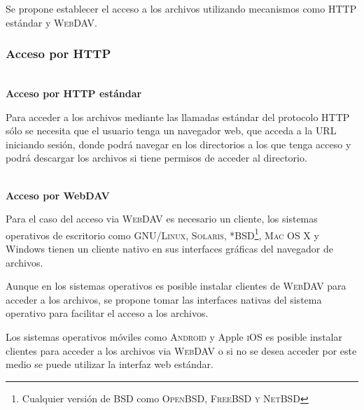 Se propone establecer el acceso a los archivos utilizando mecanismos como \textsc{HTTP} est\'{a}ndar y \textsc{WebDAV}.

        \subsubsection {Acceso por HTTP}

          \textbf{\\ Acceso por HTTP est\'{a}ndar \\}

Para acceder a los archivos mediante las llamadas est\'{a}ndar del protocolo HTTP s\'{o}lo se necesita que el usuario tenga un navegador web, que acceda a la \textsc{URL} iniciando sesi\'{o}n, donde podr\'{a} navegar en los directorios a los que tenga acceso y podr\'{a} descargar los archivos si tiene permisos de acceder al directorio.

          \textbf{\\ Acceso por WebDAV \\}

Para el caso del acceso via \textsc{WebDAV} es necesario un cliente, los sistemas operativos de escritorio como \textsc{GNU/Linux}, \textsc{Solaris}, \textsc{*BSD\footnote{Cualquier versi\'{o}n de BSD como \textsc{OpenBSD, FreeBSD y NetBSD}}}, \textsc{Mac OS X} y Windows tienen un cliente nativo en sus interfaces gr\'{a}ficas del navegador de archivos.

Aunque en los sistemas operativos es posible instalar clientes de \textsc{WebDAV} para acceder a los archivos, se propone tomar las interfaces nativas del sistema operativo para facilitar el acceso a los archivos.

Los sistemas operativos m\'{o}viles como \textsc{Android} y Apple \textsc{iOS} es posible instalar clientes para acceder a los archivos via \textsc{WebDAV} o si no se desea acceder por este medio se puede utilizar la interfaz web est\'{a}ndar.

%
%
%

